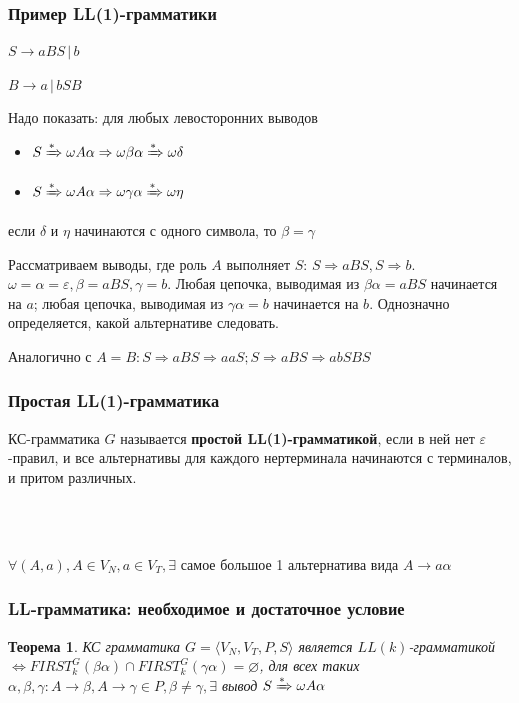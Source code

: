 \documentclass{beamer}
\newtheorem{rutheorem}{Теорема}
\newcommand{\derive}[0]{\xRightarrow[]{*}}
\begin{document}
\begin{frame}[fragile]
  \transwipe[direction=90]
  \frametitle{Пример LL(1)-грамматики}
  $S \rightarrow a B S \, | \, b$
  
  $B \rightarrow a \, | \, b S B$

  Надо показать: для любых левосторонних выводов
  \begin{itemize}
    \item $S \derive \omega A \alpha \Rightarrow \omega \beta \alpha \derive \omega \delta$
    \item $S \derive \omega A \alpha \Rightarrow \omega \gamma \alpha \derive \omega \eta$
  \end{itemize} 
  если $\delta$ и $\eta$ начинаются с одного символа, то $\beta = \gamma$
  
  Рассматриваем выводы, где роль $A$ выполняет $S$: $S \Rightarrow a B S, S \Rightarrow b$. $\omega = \alpha = \varepsilon, \beta = a B S, \gamma = b$. Любая цепочка, выводимая из $\beta \alpha = a B S$ начинается на $a$; любая цепочка, выводимая из $\gamma \alpha = b$ начинается на $b$. Однозначно определяется, какой альтернативе следовать. 
  
  Аналогично с $A = B: S \Rightarrow a B S \Rightarrow a a S; S \Rightarrow a B S \Rightarrow a b S B S$ 
\end{frame}


\begin{frame}[fragile]
  \transwipe[direction=90]
  \frametitle{Простая LL(1)-грамматика}
  КС-грамматика $G$ называется \textbf{простой LL(1)-грамматикой}, если в ней нет $\varepsilon$-правил, и все альтернативы для каждого нертерминала начинаются с терминалов, и притом различных. 
  
  ~\\~ 
  
  $\forall (A, a), A \in V_N, a \in V_T, \exists $ самое большое 1 альтернатива вида $A \rightarrow a \alpha$
  
\end{frame}


\begin{frame}[fragile]
  \transwipe[direction=90]
  \frametitle{LL-грамматика: необходимое и достаточное условие}
  \begin{rutheorem}
  КС грамматика $G = \langle V_N, V_T, P, S \rangle$ является $LL(k)$-грамматикой $\Leftrightarrow FIRST^G_k(\beta \alpha) \cap FIRST^G_k(\gamma \alpha) = \varnothing$, для всех таких $\alpha, \beta, \gamma: A \rightarrow \beta, A \rightarrow \gamma \in P, \beta \neq \gamma, \exists$ вывод $S \derive \omega A \alpha$
  \end{rutheorem}  

\end{frame}
\end{document}
